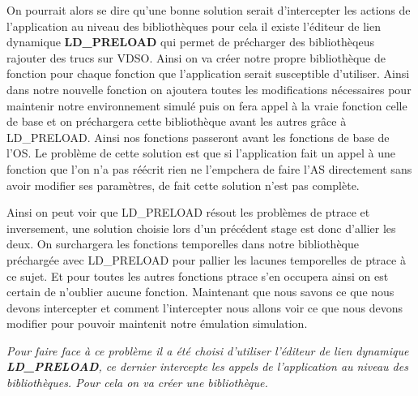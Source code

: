 On pourrait alors se dire qu'une bonne solution serait d'intercepter les actions
de l'application au niveau des bibliothèques pour cela il existe l'éditeur de
lien dynamique \textbf{LD\_PRELOAD} qui permet de précharger des
bibliothèqeus{\color{red} rajouter des trucs sur VDSO}. Ainsi on va créer notre
propre bibliothèque de fonction pour chaque fonction que l'application serait
susceptible d'utiliser. Ainsi dans notre nouvelle fonction on ajoutera toutes
les modifications nécessaires pour maintenir notre environnement simulé puis on
fera appel à la vraie fonction celle de base et on préchargera cette
bibliothèque avant les autres grâce à LD\_PRELOAD. Ainsi nos fonctions passeront
avant les fonctions de base de l'OS. Le problème de cette solution est que si
l'application fait un appel à une fonction que l'on n'a pas réécrit rien ne
l'empchera de faire l'AS directement sans avoir modifier ses paramètres, de fait
cette solution n'est pas complète.

Ainsi on peut voir que LD\_PRELOAD résout les problèmes de ptrace et
inversement, une solution choisie lors d'un précédent stage est donc d'allier
les deux. On surchargera les fonctions temporelles dans notre bibliothèque
préchargée avec LD\_PRELOAD pour pallier les lacunes temporelles de ptrace à ce
sujet. Et pour toutes les autres fonctions ptrace s'en occupera ainsi on est
certain de n'oublier aucune fonction. Maintenant que nous savons ce que nous
devons intercepter et comment l'intercepter nous allons voir ce que nous devons
modifier pour pouvoir maintenit notre émulation simulation.

\textit{Pour faire face à ce problème il a été choisi d'utiliser l'éditeur de
  lien dynamique \textbf{LD\_PRELOAD}, ce dernier intercepte les appels de
  l'application au niveau des bibliothèques. Pour cela on va créer une
  bibliothèque.}

